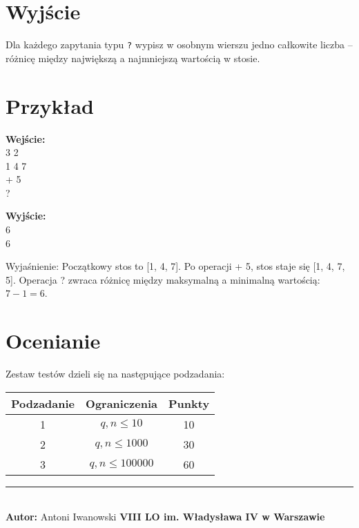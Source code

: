 \documentclass[a4paper,11pt]{article}
\newcommand{\tasktitle}{Świąteczne Prezenty}
\newcommand{\taskshort}{PRE}
\newcommand{\contestinfo}{Konkurs Świąteczny 2024 - Grupa Początkująca.}
\newcommand{\memorylimit}{128 MB}
\newcommand{\exampleinput}{3 2\\1 4 7\\+ 5\\?}
\newcommand{\exampleoutput}{6\\6}
\newcommand{\explanation}{Początkowy stos to [1, 4, 7]. Po operacji + 5, stos staje się [1, 4, 7, 5]. Operacja ? zwraca różnicę między maksymalną a minimalną wartością: $7 - 1 = 6$.}
\newcommand{\subtasktable}{%
\begin{tabular}{|c|c|c|}
\hline
Podzadanie & Ograniczenia & Punkty \\
\hline
1 & $q, n \leq 10$ & 10 \\
2 & $q, n \leq 1000$ & 30 \\
3 & $q, n \leq 100000$ & 60 \\
\hline
\end{tabular}}
\begin{document}
\section*{Wyjście}
Dla każdego zapytania typu \texttt{?} wypisz w osobnym wierszu jedno całkowite liczba – różnicę między największą a najmniejszą wartością w stosie.
\newpage
\section*{Przykład}
\begin{multicols}{2}
\noindent\textbf{Wejście:} \\
\exampleinput

\columnbreak

\noindent\textbf{Wyjście:} \\
\exampleoutput
\end{multicols}

\noindent Wyjaśnienie: \explanation

\section*{Ocenianie}
Zestaw testów dzieli się na następujące podzadania:
\begin{center}
\subtasktable
\end{center}

\vspace*{\fill}
\noindent\rule{\textwidth}{0.4pt} \\
\small \textbf{Autor:} Antoni Iwanowski \hfill \textbf{VIII LO im. Władysława IV w Warszawie}

\end{document}
